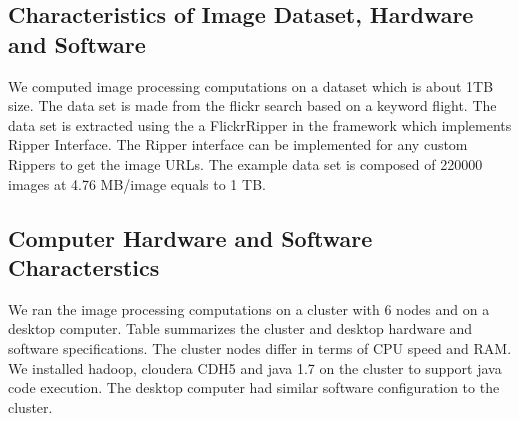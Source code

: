 \documentclass[conference]{IEEEtran}
\begin{document}

\subsection{Characteristics of Image Dataset, Hardware and Software}
We computed image processing computations on a dataset which is about 1TB size. The data set is made from the flickr search based on a keyword flight. The data set is extracted using the a FlickrRipper in the framework which implements Ripper Interface. The Ripper interface can be implemented for any custom Rippers to get the image URLs. The example data set is composed of 220000 images at 4.76 MB/image equals to 1 TB.  

\subsection{Computer Hardware and Software Characterstics}
We ran the image processing computations on a cluster with 6 nodes and on a desktop computer. Table summarizes the cluster and desktop hardware and software specifications. The cluster nodes differ in terms of CPU speed and RAM. We installed hadoop, cloudera CDH5 and java 1.7 on the cluster to support java code execution. The desktop computer had similar software configuration to the cluster.
\end{document}
